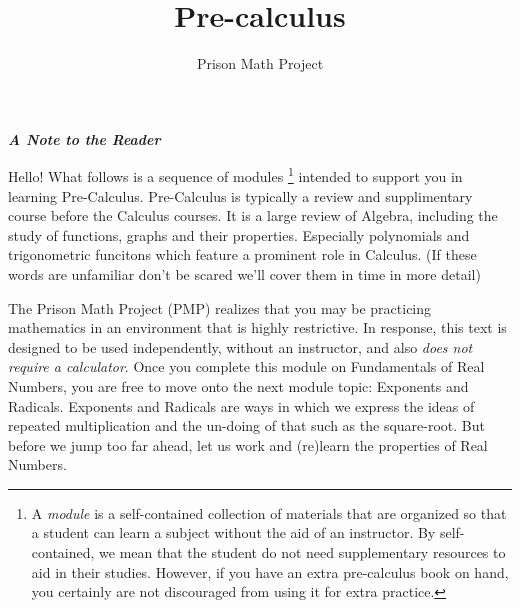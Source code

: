 \documentclass{amsart}
\numberwithin{equation}{section}
\theoremstyle{plain} %
\theoremstyle{definition}
\theoremstyle{remark}
\begin{document}
\title{Pre-calculus}


\author{Prison Math Project}
\date{}


\maketitle

\textbf{\textit{A Note to the Reader}}%

Hello! What follows is a sequence of modules \footnote{A \textit{module} is a self-contained collection of materials that are organized so that a student can learn a subject without the aid of an instructor.
By self-contained, we mean that the student do  not need supplementary resources to aid in their studies. However, if you have an extra pre-calculus book on hand, you certainly are not discouraged from using it 
for extra practice.} intended to support you in learning Pre-Calculus. Pre-Calculus is typically a review and supplimentary course before the Calculus courses. It is a large review of Algebra, including the study
of functions, graphs and their properties. Especially polynomials and trigonometric funcitons which feature a prominent role in Calculus. (If these words are unfamiliar don't be scared we'll cover them in time in more
detail)

The Prison Math Project (PMP) realizes that you may be practicing mathematics in an environment that is highly restrictive. In response, this text is designed to be used independently, without an instructor, 
and also \textit{does not require a calculator}. Once you complete this module on Fundamentals of Real Numbers, you are free to move onto the next module topic: Exponents and Radicals. Exponents and Radicals are
ways in which we express the ideas of repeated multiplication and the un-doing of that such as the square-root. But before we jump too far ahead, let us work and (re)learn the properties of Real Numbers.%

\end{document}
